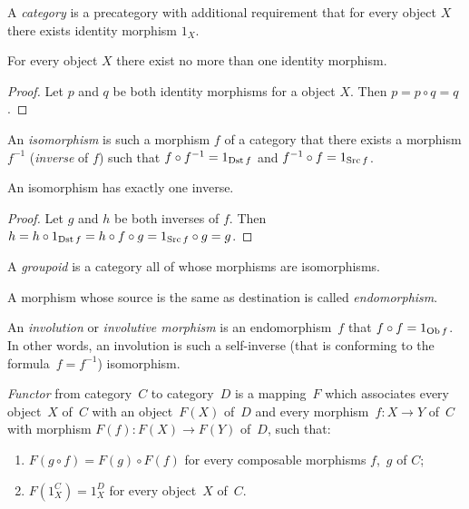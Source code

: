 \begin{defn}
A \emph{category} is a precategory with additional
requirement that for every object $X$ there exists identity morphism
$1_{X}$.\end{defn}
\begin{prop}
For every object $X$ there exist no more than one identity morphism.\end{prop}
\begin{proof}
Let $p$ and $q$ be both identity morphisms for a object $X$. Then
$p=p\circ q=q$.\end{proof}
\begin{defn}
An \emph{isomorphism} is such
a morphism $f$ of a category that there exists a morphism $f^{-1}$
(\emph{inverse} of $f$) such that $f\circ f^{-1}=1_{\operatorname{Dst} f}$ and
$f^{-1}\circ f=1_{\operatorname{Src} f}$.\end{defn}
\begin{prop}
An isomorphism has exactly one inverse.\end{prop}
\begin{proof}
Let $g$ and $h$ be both inverses of $f$. Then $h=h\circ1_{\operatorname{Dst} f}=h\circ f\circ g=1_{\operatorname{Src} f}\circ g=g$.\end{proof}
\begin{defn}
A \emph{groupoid} is a category all of whose morphisms
are isomorphisms.
\end{defn}

\begin{defn}
A morphism whose source is the same as destination
is called \emph{endomorphism}.
\end{defn}

\begin{defn}
An \emph{involution}
or \emph{involutive morphism} is an endomorphism~$f$ that $f\circ f=1_{\operatorname{Ob} f}$.
In other words, an involution is such a self-inverse (that is conforming
to the formula~$f=f^{-1}$) isomorphism.
\end{defn}

\begin{defn}
\emph{Functor} from category~$C$ to category~$D$ is a mapping~$F$
which associates every object~$X$ of~$C$ with an object~$F(X)$
of~$D$ and every morphism~$f:X\rightarrow Y$ of~$C$ with morphism
$F(f):F(X)\rightarrow F(Y)$ of~$D$, such that:
\begin{enumerate}
\item $F(g\circ f)=F(g)\circ F(f)$ for every composable morphisms $f$,~$g$
of $C$;
\item $F(1_{X}^{C})=1_{X}^{D}$ for every object~$X$ of~$C$.
\end{enumerate}
\end{defn}

